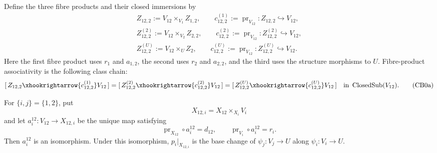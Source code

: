 \begin{definition}
  \label{def:nagata-two-open-comparison-boundary}
  \lean{}

  Define the three fibre products and their closed immersions by
  \[
  \begin{gathered}
    Z_{12,2}:=V_{12}\times_{V_1}Z_{1,2},
    \qquad
    c_{12,2}^{(1)}:=\operatorname{pr}_{V_{12}}\colon
      Z_{12,2}\hookrightarrow V_{12},\\
    Z_{12,2}^{(2)}:=V_{12}\times_{V_2}Z_{2,2},
    \qquad
    c_{12,2}^{(2)}:=\operatorname{pr}_{V_{12}}\colon
      Z_{12,2}^{(2)}\hookrightarrow V_{12},\\
    Z_{12,2}^{(U)}:=V_{12}\times_UZ_2,
    \qquad
    c_{12,2}^{(U)}:=\operatorname{pr}_{V_{12}}\colon
      Z_{12,2}^{(U)}\hookrightarrow V_{12}.
  \end{gathered}
  \]
  Here the first fibre product uses $r_1$ and $a_{1,2}$, the second uses
  $r_2$ and $a_{2,2}$, and the third uses the structure morphisms to $U$.
  Fibre-product associativity is the following class chain:
  \[
    [\,Z_{12,2}\xhookrightarrow{c_{12,2}^{(1)}}V_{12}\,]
      =[\,Z_{12,2}^{(2)}\xhookrightarrow{c_{12,2}^{(2)}}V_{12}\,]
      =[\,Z_{12,2}^{(U)}\xhookrightarrow{c_{12,2}^{(U)}}V_{12}\,]
      \quad\text{in }\operatorname{ClosedSub}(V_{12}).          \tag{CB0a}
  \]
\end{definition}

\begin{lemma}
  \label{lemma:nagata-comparison-restrict-proper-open}
  \lean{}

  For $\{i,j\}=\{1,2\}$, put
  \[
    X_{12,i}=X_{12}\times_{X_i}V_i
  \]
  and let $a_i^{12}\colon V_{12}\to X_{12,i}$ be the unique map satisfying
  \[
    \operatorname{pr}_{X_{12}}\circ a_i^{12}=d_{12},\qquad
    \operatorname{pr}_{V_i}\circ a_i^{12}=r_i.
  \]
  Then $a_i^{12}$ is an isomorphism.  Under this isomorphism,
  $p_i|_{X_{12,i}}$ is the base change of
  $\psi_j\colon V_j\to U$ along $\psi_i\colon V_i\to U$.
\end{lemma}

